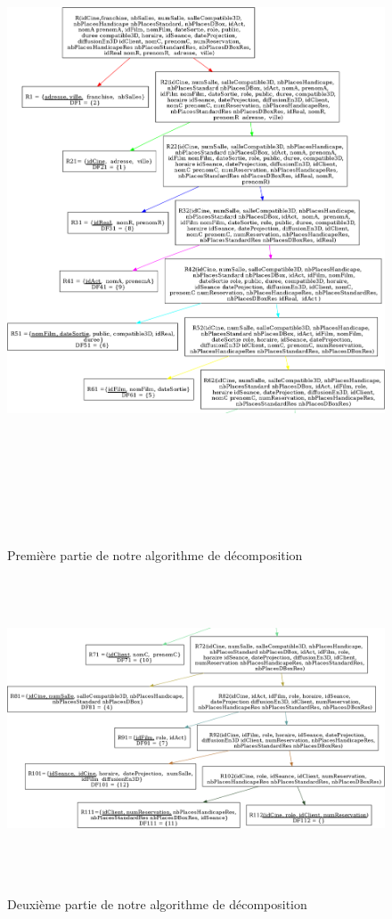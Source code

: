 \documentclass[a4paper,sffamily,12pt]{article}
\begin{document}
					\begin{figure}[!h]		
						\hspace{-2cm}
						{\includegraphics[height=19cm]{picture/decomp1.png}}
						\caption{Première partie de notre algorithme de décomposition}
						\label{decomp1}	
					\end{figure}	
				
					\begin{figure}[!h]		
						\hspace{-2cm}
						{\includegraphics[height=9cm]{picture/decomp2.png}}
						\caption{Deuxième partie de notre algorithme de décomposition}
						\label{decomp2}	
					\end{figure}		
	
\end{document}
